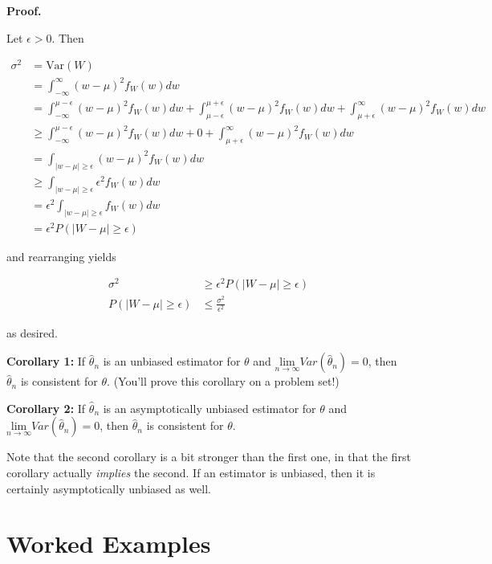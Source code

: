 \documentclass[
  letterpaper,
  DIV=11,
  numbers=noendperiod]{scrreprt}
\begin{document}
\textbf{Proof.}

Let \(\epsilon > 0\). Then

\begin{align*}
\sigma^2 & = \text{Var}(W) \\
& = \int_{-\infty}^\infty (w-\mu)^2 f_W(w)dw \\
& = \int_{-\infty}^{\mu - \epsilon} (w-\mu)^2 f_W(w)dw + \int_{\mu - \epsilon}^{\mu + \epsilon} (w-\mu)^2 f_W(w)dw + \int_{\mu + \epsilon}^\infty (w-\mu)^2 f_W(w)dw \\
& \ge \int_{-\infty}^{\mu - \epsilon} (w-\mu)^2 f_W(w)dw + 0  + \int_{\mu + \epsilon}^\infty (w-\mu)^2 f_W(w)dw \\
&= \int_{|w-\mu|\ge \epsilon} (w-\mu)^2 f_W(w)dw \\
& \ge \int_{|w-\mu|\ge \epsilon} \epsilon^2 f_W(w)dw \\
& = \epsilon^2 \int_{|w-\mu|\ge \epsilon} f_W(w)dw\\
& = \epsilon^2 P(|W-\mu| \ge \epsilon)
\end{align*}

and rearranging yields

\begin{align*}
\sigma^2 & \geq \epsilon^2 P(|W-\mu| \ge \epsilon) \\
P(|W-\mu| \geq \epsilon) & \leq \frac{\sigma^2}{\epsilon^2}
\end{align*}

as desired.

\textbf{Corollary 1:} If \(\hat{\theta}_n\) is an unbiased estimator for
\(\theta\) and
\(\underset{n \to \infty}{\text{lim}} Var(\hat{\theta}_n) = 0\), then
\(\hat{\theta}_n\) is consistent for \(\theta\). (You'll prove this
corollary on a problem set!)

\textbf{Corollary 2:} If \(\hat{\theta}_n\) is an asymptotically
unbiased estimator for \(\theta\) and
\(\underset{n \to \infty}{\text{lim}} Var(\hat{\theta}_n) = 0\), then
\(\hat{\theta}_n\) is consistent for \(\theta\).

Note that the second corollary is a bit stronger than the first one, in
that the first corollary actually \emph{implies} the second. If an
estimator is unbiased, then it is certainly asymptotically unbiased as
well.

\hypertarget{worked-examples-4}{%
\section{Worked Examples}\label{worked-examples-4}}
\end{document}
